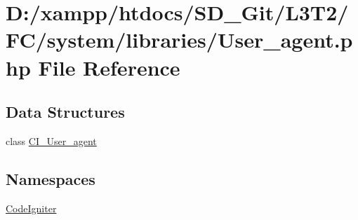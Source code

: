 \hypertarget{system_2libraries_2_user__agent_8php}{}\section{D\+:/xampp/htdocs/\+S\+D\+\_\+\+Git/\+L3\+T2/\+F\+C/system/libraries/\+User\+\_\+agent.php File Reference}
\label{system_2libraries_2_user__agent_8php}
\subsection*{Data Structures}
\begin{DoxyCompactItemize}
\item 
class \hyperlink{class_c_i___user__agent}{C\+I\+\_\+\+User\+\_\+agent}
\end{DoxyCompactItemize}
\subsection*{Namespaces}
\begin{DoxyCompactItemize}
\item 
 \hyperlink{namespace_code_igniter}{Code\+Igniter}
\end{DoxyCompactItemize}
